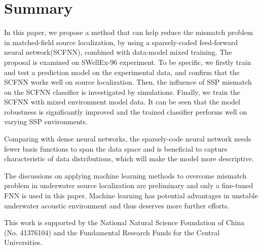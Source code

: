 \section{Summary}
In this paper, we propose a method that can help reduce the mismatch problem in matched-field source localization,
by using a sparsely-coded feed-forward neural network(SCFNN), combined with data-model mixed training.
The proposal is examined on SWellEx-96 experiment.
To be specific, we firstly train and test a prediction model on the experimental data,
and confirm that the SCFNN works well on source localization.
Then, the influence of SSP mismatch on the SCFNN classifier is investigated by simulations. Finally, we train the SCFNN with mixed environment model data.
It can be seen that the model robustness is significantly improved and the trained classifier performs well on varying SSP environments.

Comparing with dense neural networks, the sparsely-code neural network needs fewer basis functions to span the data space and
is beneficial to capture characteristic of data distributions, which will make the model more descriptive.

The discussions on applying machine learning methods to overcome mismatch problem in underwater source localization are preliminary and only a fine-tuned FNN is used in this paper. Machine learning has potential advantages in unstable underwater acoustic environment and thus deserves more further efforts.

\begin{acks}
This work is supported by the National Natural Science Foundation of China (No. 41376104) and  the Fundamental Research Funds for the Central Universities.
\end{acks}
